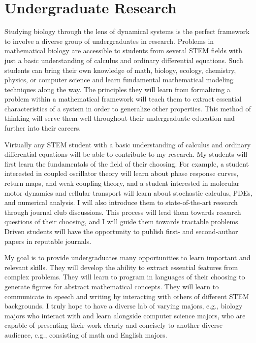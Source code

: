 \documentclass[a4paper,11pt]{article}
\begin{document}
\section{Undergraduate Research}\label{sec:undergrad}

Studying biology through the lens of dynamical systems is the perfect framework to involve a diverse group of undergraduates in research. Problems in mathematical biology are accessible to students from several STEM fields with just a basic understanding of calculus and ordinary differential equations. Such students can bring their own knowledge of math, biology, ecology, chemistry, physics, or computer science and learn fundamental mathematical modeling techniques along the way. The principles they will learn from formalizing a problem within a mathematical framework will teach them to extract essential characteristics of a system in order to generalize other properties. This method of thinking will serve them well throughout their undergraduate education and further into their careers.

Virtually any STEM student with a basic understanding of calculus and ordinary differential equations will be able to contribute to my research. My students will first learn the fundamentals of the field of their choosing. For example, a student interested in coupled oscillator theory will learn about phase response curves, return maps, and weak coupling theory, and a student interested in molecular motor dynamics and cellular transport will learn about stochastic calculus, PDEs, and numerical analysis. I will also introduce them to state-of-the-art research through journal club discussions. This process will lead them towards research questions of their choosing, and I will guide them towards tractable problems. Driven students will have the opportunity to publish first- and second-author papers in reputable journals.

My goal is to provide undergraduates many opportunities to learn important and relevant skills. They will develop the ability to extract essential features from complex problems. They will learn to program in languages of their choosing to generate figures for abstract mathematical concepts. They will learn to communicate in speech and writing by interacting with others of different STEM backgrounds. I truly hope to have a diverse lab of varying majors, e.g., biology majors who interact with and learn alongside computer science majors, who are capable of presenting their work clearly and concisely to another diverse audience, e.g., consisting of math and English majors.
\end{document}
